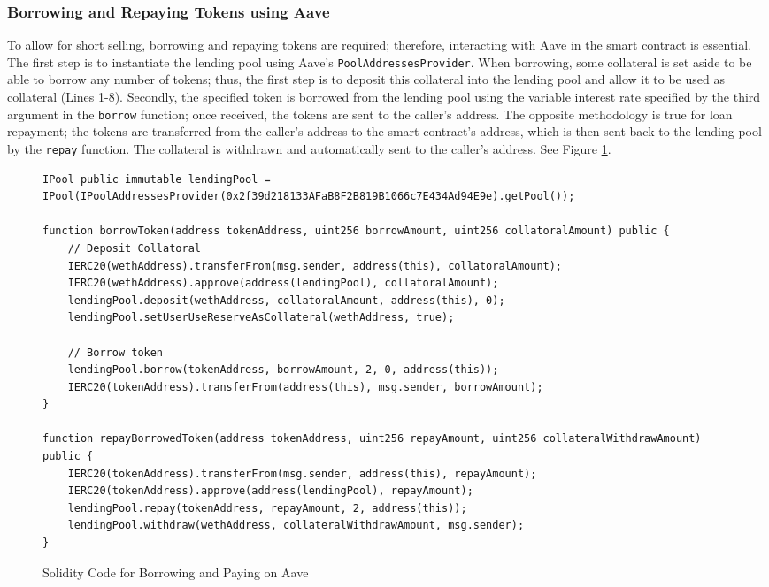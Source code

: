 \subsubsection{Borrowing and Repaying Tokens using Aave}
To allow for short selling, borrowing and repaying tokens are required; therefore, interacting with Aave in the smart contract is essential. The first step is to instantiate the lending pool using Aave's \texttt{PoolAddressesProvider}. When borrowing, some collateral is set aside to be able to borrow any number of tokens; thus, the first step is to deposit this collateral into the lending pool and allow it to be used as collateral (Lines 1-8). Secondly, the specified token is borrowed from the lending pool using the variable interest rate specified by the third argument in the \texttt{borrow} function; once received, the tokens are sent to the caller's address. The opposite methodology is true for loan repayment; the tokens are transferred from the caller's address to the smart contract's address, which is then sent back to the lending pool by the \texttt{repay} function. The collateral is withdrawn and automatically sent to the caller's address. See Figure \ref{fig:sol-code-aave}.

\begin{figure}[htb!]
\begin{adjustwidth}{-0.5in}{-0.5in}
\begin{minipage}{\linewidth}
\centering
\begin{lstlisting}[language=Solidity]
IPool public immutable lendingPool = IPool(IPoolAddressesProvider(0x2f39d218133AFaB8F2B819B1066c7E434Ad94E9e).getPool());

function borrowToken(address tokenAddress, uint256 borrowAmount, uint256 collatoralAmount) public {
    // Deposit Collatoral
    IERC20(wethAddress).transferFrom(msg.sender, address(this), collatoralAmount);
    IERC20(wethAddress).approve(address(lendingPool), collatoralAmount);
    lendingPool.deposit(wethAddress, collatoralAmount, address(this), 0);
    lendingPool.setUserUseReserveAsCollateral(wethAddress, true);

    // Borrow token
    lendingPool.borrow(tokenAddress, borrowAmount, 2, 0, address(this));
    IERC20(tokenAddress).transferFrom(address(this), msg.sender, borrowAmount);
}

function repayBorrowedToken(address tokenAddress, uint256 repayAmount, uint256 collateralWithdrawAmount) public {
    IERC20(tokenAddress).transferFrom(msg.sender, address(this), repayAmount);
    IERC20(tokenAddress).approve(address(lendingPool), repayAmount);
    lendingPool.repay(tokenAddress, repayAmount, 2, address(this));
    lendingPool.withdraw(wethAddress, collateralWithdrawAmount, msg.sender);
}
\end{lstlisting}
\end{minipage}
\end{adjustwidth}
\caption{Solidity Code for Borrowing and Paying on Aave \label{fig:sol-code-aave}}
\end{figure}
